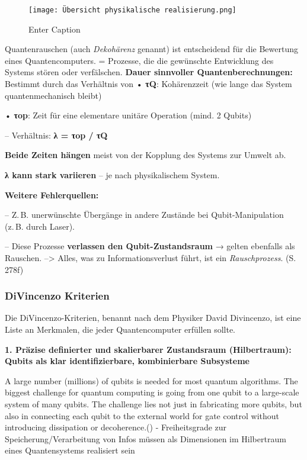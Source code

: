 \begin{figure}
    \centering
    \texttt{[image: Übersicht physikalische realisierung.png]}
    \caption{Enter Caption}
    \label{fig:enter-label}
\end{figure}
\cite{nielsen_michael_a_and_isaac_l_chuang_quantum_2010}

Quantenrauschen (auch \textit{Dekohärenz} genannt) ist entscheidend für die Bewertung eines Quantencomputers.
= Prozesse, die die gewünschte Entwicklung des Systems stören oder verfälschen.
\textbf{Dauer sinnvoller Quantenberechnungen:}
 Bestimmt durch das Verhältnis von
 • \textbf{τQ}: Kohärenzzeit (wie lange das System quantenmechanisch bleibt)

 • \textbf{τop}: Zeit für eine elementare unitäre Operation (mind. 2 Qubits)

 – Verhältnis: \textbf{λ = τop / τQ}
    \item \textbf{Beide Zeiten hängen} meist von der Kopplung des Systems zur Umwelt ab.
    \item \textbf{λ kann stark variieren} – je nach physikalischem System.
    \item \textbf{Weitere Fehlerquellen:}

 – Z. B. unerwünschte Übergänge in andere Zustände bei Qubit-Manipulation (z. B. durch Laser).

 – Diese Prozesse \textbf{verlassen den Qubit-Zustandsraum} → gelten ebenfalls als Rauschen.
--> Alles, was zu Informationsverlust führt, ist ein \textit{Rauschprozess}. (S. 278f)


\subsubsection{DiVincenzo Kriterien}

Die DiVincenzo-Kriterien, benannt nach dem Physiker David Divincenzo, ist eine Liste an Merkmalen, die jeder Quantencomputer erfüllen sollte. 

\textbf{1. Präzise definierter und skalierbarer Zustandsraum (Hilbertraum): Qubits als klar identifizierbare, kombinierbare Subsysteme} 

A large number (millions) of qubits is needed for most quantum algorithms. The
biggest challenge for quantum computing is going from one qubit to a large-scale
system of many qubits. The challenge lies not just in fabricating more qubits, but also
in connecting each qubit to the external world for gate control without introducing
dissipation or decoherence.(\cite{lapierre_introduction_2021})
- Freiheitsgrade zur Speicherung/Verarbeitung von Infos müssen als Dimensionen im Hilbertraum eines Quantensystems realisiert sein 

